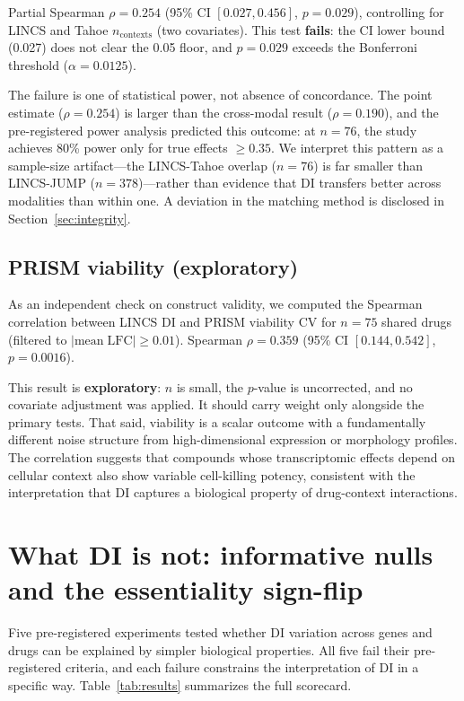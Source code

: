 \documentclass[11pt]{article}
\begin{document}
Partial Spearman $\rho = 0.254$ (95\% CI $[0.027, 0.456]$,
$p = 0.029$), controlling for LINCS and Tahoe $n_{\mathrm{contexts}}$
(two covariates).  This test \textbf{fails}: the CI lower bound
(0.027) does not clear the 0.05 floor, and $p = 0.029$ exceeds the
Bonferroni threshold ($\alpha = 0.0125$).

The failure is one of statistical power, not absence of concordance.
The point estimate ($\rho = 0.254$) is larger than the cross-modal result
($\rho = 0.190$), and the pre-registered power analysis predicted this
outcome: at $n = 76$, the study achieves 80\% power only for true
effects $\geq 0.35$.  We interpret this pattern as a sample-size
artifact---the LINCS-Tahoe overlap ($n = 76$) is far smaller than
LINCS-JUMP ($n = 378$)---rather than evidence that DI transfers better
across modalities than within one.  A deviation in the matching method
is disclosed in Section~\ref{sec:integrity}.

\subsection{PRISM viability (exploratory)}

As an independent check on construct validity, we computed the Spearman
correlation between LINCS DI and PRISM viability CV for $n = 75$ shared
drugs (filtered to $|\mathrm{mean\;LFC}| \geq 0.01$).  Spearman
$\rho = 0.359$ (95\% CI $[0.144, 0.542]$, $p = 0.0016$).

This result is \textbf{exploratory}: $n$ is small, the $p$-value is
uncorrected, and no covariate adjustment was applied.  It should carry
weight only alongside the primary tests.  That said, viability is a
scalar outcome with a fundamentally different noise structure from
high-dimensional expression or morphology profiles.  The correlation
suggests that compounds whose transcriptomic effects depend on cellular
context also show variable cell-killing potency, consistent with the
interpretation that DI captures a biological property of drug-context
interactions.


\section{What DI is not: informative nulls and the essentiality
sign-flip}
\label{sec:whatnot}

Five pre-registered experiments tested whether DI variation across genes
and drugs can be explained by simpler biological properties.  All five
fail their pre-registered criteria, and each failure constrains the
interpretation of DI in a specific way.  Table~\ref{tab:results}
summarizes the full scorecard.
\end{document}
